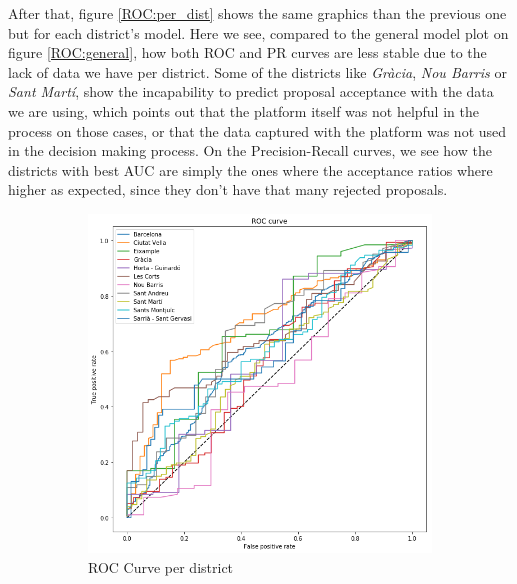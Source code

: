 After that, figure \ref{ROC:per_dist} shows the same graphics than the previous one but for each district's model. Here we see, compared to the general model plot on figure \ref{ROC:general}, how both ROC and PR curves are less stable due to the lack of data we have per district. Some of the districts like \emph{Gr\`acia}, \emph{Nou Barris} or \emph{Sant Mart\'i}, show the incapability to predict proposal acceptance with the data we are using, which points out that the platform itself was not helpful in the process on those cases, or that the data captured with the platform was not used in the decision making process. On the Precision-Recall curves, we see how the districts with best AUC are simply the ones where the acceptance ratios where higher as expected, since they don't have that many rejected proposals.

\begin{figure}[t]
    \centering
    \begin{subfigure}{0.5\textwidth}
        \centering
        \includegraphics[width=\textwidth]{Figures/ROC_barri.png}
        \caption{ROC Curve per district}
    \end{subfigure}%
    ~ 
    \begin{subfigure}{0.5\textwidth}
        \centering        

\end{subfigure}
\end{figure}

